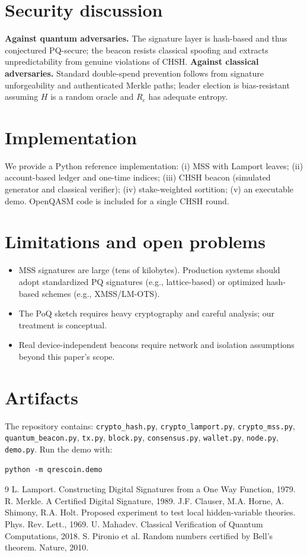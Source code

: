 \documentclass[11pt]{article}
\begin{document}
\section{Security discussion}
\textbf{Against quantum adversaries.} The signature layer is hash-based and thus conjectured PQ-secure; the beacon resists classical spoofing and extracts unpredictability from genuine violations of CHSH.
\textbf{Against classical adversaries.} Standard double-spend prevention follows from signature unforgeability and authenticated Merkle paths; leader election is bias-resistant assuming $H$ is a random oracle and $R_e$ has adequate entropy.

\section{Implementation}
We provide a Python reference implementation:
(i) MSS with Lamport leaves; (ii) account-based ledger and one-time indices; (iii) CHSH beacon (simulated generator and classical verifier); (iv) stake-weighted sortition; (v) an executable demo.
OpenQASM code is included for a single CHSH round.

\section{Limitations and open problems}
\begin{itemize}
  \item MSS signatures are large (tens of kilobytes). Production systems should adopt standardized PQ signatures (e.g., lattice-based) or optimized hash-based schemes (e.g., XMSS/LM-OTS).
  \item The PoQ sketch requires heavy cryptography and careful analysis; our treatment is conceptual.
  \item Real device-independent beacons require network and isolation assumptions beyond this paper's scope.
\end{itemize}

\section*{Artifacts}
The repository contains: \texttt{crypto\_hash.py}, \texttt{crypto\_lamport.py}, \texttt{crypto\_mss.py}, \texttt{quantum\_beacon.py}, \texttt{tx.py}, \texttt{block.py}, \texttt{consensus.py}, \texttt{wallet.py}, \texttt{node.py}, \texttt{demo.py}. Run the demo with:
\begin{verbatim}
python -m qrescoin.demo
\end{verbatim}


\begin{thebibliography}{9}
 L. Lamport. Constructing Digital Signatures from a One Way Function, 1979.
 R. Merkle. A Certified Digital Signature, 1989.
 J.F. Clauser, M.A. Horne, A. Shimony, R.A. Holt. Proposed experiment to test local hidden-variable theories. Phys. Rev. Lett., 1969.
 U. Mahadev. Classical Verification of Quantum Computations, 2018.
 S. Pironio et al. Random numbers certified by Bell’s theorem. Nature, 2010.
\end{thebibliography}
\end{document}
